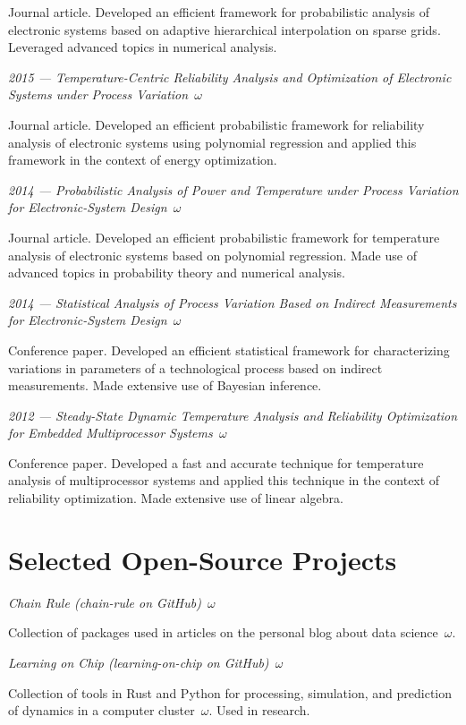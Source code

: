 \documentclass{article}
\begin{document}
Journal article. Developed an efficient framework for probabilistic analysis of
electronic systems based on adaptive hierarchical interpolation on sparse grids.
Leveraged advanced topics in numerical analysis.

\emph{2015 --- Temperature-Centric Reliability Analysis and Optimization of
Electronic Systems under Process Variation~$\omega$}

Journal article. Developed an efficient probabilistic framework for reliability
analysis of electronic systems using polynomial regression and applied this
framework in the context of energy optimization.

\emph{2014 --- Probabilistic Analysis of Power and Temperature under Process
Variation for Electronic-System Design~$\omega$}

Journal article. Developed an efficient probabilistic framework for temperature
analysis of electronic systems based on polynomial regression. Made use of
advanced topics in probability theory and numerical analysis.

\emph{2014 --- Statistical Analysis of Process Variation Based on Indirect
Measurements for Electronic-System Design~$\omega$}

Conference paper. Developed an efficient statistical framework for
characterizing variations in parameters of a technological process based on
indirect measurements. Made extensive use of Bayesian inference.

\emph{2012 --- Steady-State Dynamic Temperature Analysis and Reliability
Optimization for Embedded Multiprocessor Systems~$\omega$}

Conference paper. Developed a fast and accurate technique for temperature
analysis of multiprocessor systems and applied this technique in the context of
reliability optimization. Made extensive use of linear algebra.

\section{Selected Open-Source Projects}

\emph{Chain Rule (chain-rule on GitHub)~$\omega$}

Collection of packages used in articles on the personal blog about data
science~$\omega$.

\emph{Learning on Chip (learning-on-chip on GitHub)~$\omega$}

Collection of tools in Rust and Python for processing, simulation, and
prediction of dynamics in a computer cluster~$\omega$. Used in research.
\end{document}
